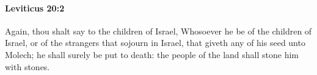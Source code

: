 
		\paragraph{Leviticus 20:2} %
			\label{LEVITICUS-20-2}

			Again, thou shalt say to the children of Israel, Whosoever he be of the children of Israel, or of the strangers that sojourn in Israel, that giveth any of his seed unto Molech; he shall surely be put to death: the people of the land shall stone him with stones.


